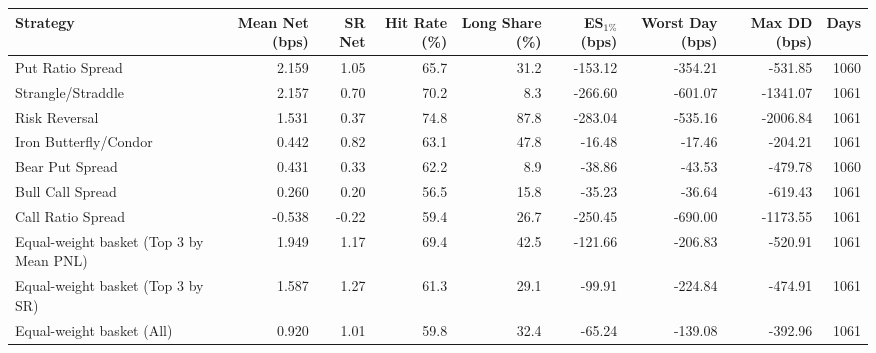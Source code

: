 \begin{tabular}{lrrrrrrrr}
\toprule
Strategy & Mean Net (bps) & SR Net & Hit Rate (\%) & Long Share (\%) & ES$_{1\%}$ (bps) & Worst Day (bps) & Max DD (bps) & Days \\
\midrule
Put Ratio Spread & 2.159 & 1.05 & 65.7 & 31.2 & -153.12 & -354.21 & -531.85 & 1060 \\
Strangle/Straddle & 2.157 & 0.70 & 70.2 & 8.3 & -266.60 & -601.07 & -1341.07 & 1061 \\
Risk Reversal & 1.531 & 0.37 & 74.8 & 87.8 & -283.04 & -535.16 & -2006.84 & 1061 \\
Iron Butterfly/Condor & 0.442 & 0.82 & 63.1 & 47.8 & -16.48 & -17.46 & -204.21 & 1061 \\
Bear Put Spread & 0.431 & 0.33 & 62.2 & 8.9 & -38.86 & -43.53 & -479.78 & 1060 \\
Bull Call Spread & 0.260 & 0.20 & 56.5 & 15.8 & -35.23 & -36.64 & -619.43 & 1061 \\
Call Ratio Spread & -0.538 & -0.22 & 59.4 & 26.7 & -250.45 & -690.00 & -1173.55 & 1061 \\
\midrule
Equal-weight basket (Top 3 by Mean PNL) & 1.949 & 1.17 & 69.4 & 42.5 & -121.66 & -206.83 & -520.91 & 1061 \\
Equal-weight basket (Top 3 by SR) & 1.587 & 1.27 & 61.3 & 29.1 & -99.91 & -224.84 & -474.91 & 1061 \\
Equal-weight basket (All) & 0.920 & 1.01 & 59.8 & 32.4 & -65.24 & -139.08 & -392.96 & 1061 \\
\bottomrule
\end{tabular}
